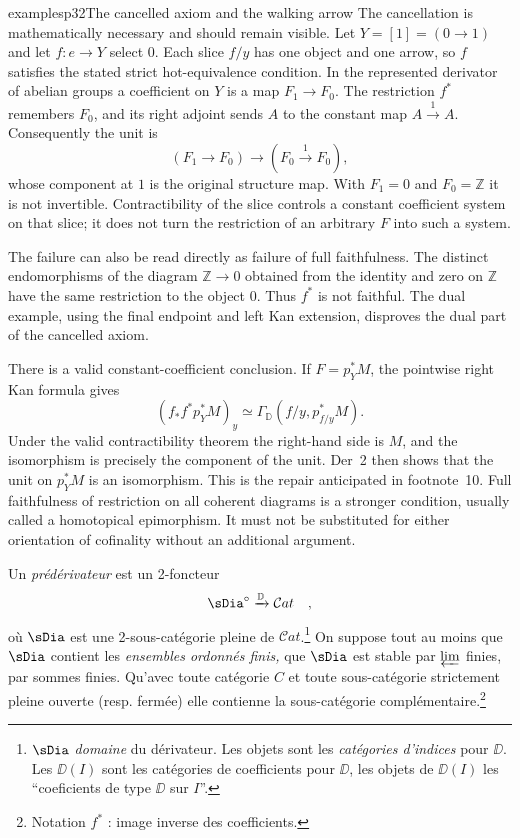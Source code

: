 \begin{dcomment}{examples}{p32}{The cancelled axiom and the walking arrow}
The cancellation is mathematically necessary and should remain visible.
Let $Y=[1]=(0\to1)$ and let $f:e\to Y$ select $0$. Each slice $f/y$
has one object and one arrow, so $f$ satisfies the stated strict
hot-equivalence condition. In the represented derivator of abelian
groups a coefficient on $Y$ is a map $F_1\to F_0$. The restriction
$f^*$ remembers $F_0$, and its right adjoint sends $A$ to the constant
map $A\xrightarrow{1}A$. Consequently the unit is
\[
 (F_1\longrightarrow F_0)\longrightarrow
 (F_0\xrightarrow{1}F_0),
\]
whose component at $1$ is the original structure map. With
$F_1=0$ and $F_0=\mathbb Z$ it is not invertible. Contractibility of
the slice controls a constant coefficient system on that slice; it
does not turn the restriction of an arbitrary $F$ into such a system.

The failure can also be read directly as failure of full faithfulness.
The distinct endomorphisms of the diagram
$\mathbb Z\to0$ obtained from the identity and zero on $\mathbb Z$
have the same restriction to the object $0$. Thus $f^*$ is not faithful.
The dual example, using the final endpoint and left Kan extension,
disproves the dual part of the cancelled axiom.

There is a valid constant-coefficient conclusion. If
$F=p_Y^*M$, the pointwise right Kan formula gives
\[
 (f_*f^*p_Y^*M)_y
 \simeq\Gamma_{\mathbb D}(f/y,p_{f/y}^*M).
\]
Under the valid contractibility theorem the right-hand side is $M$, and
the isomorphism is precisely the component of the unit. Der~2 then
shows that the unit on $p_Y^*M$ is an isomorphism. This is the repair
anticipated in footnote~10. Full faithfulness of restriction on all
coherent diagrams is a stronger condition, usually called a
homotopical epimorphism. It must not be substituted for either
orientation of cofinality without an additional argument.
\end{dcomment}


Un \textit{prédérivateur} est un 2-foncteur
\[ \sDia^\circ \xrightarrow{\DD} \mathcal{C}at \quad , \]
où $\sDia$ est une 2-sous-catégorie pleine de $\mathcal{C}at$.\footnote[11]{$\sDia$ \textit{domaine} du dérivateur. Les objets sont les \textit{catégories d'indices} pour $\DD$. Les $\DD(I)$ sont les catégories de coefficients pour $\DD$, les objets de $\DD(I)$ les “coeficients de type $\DD$ sur $I$”. %
} On suppose tout au moins que $\sDia$ contient les \textit{ensembles ordonnés finis,} que $\sDia$ est stable par $\varprojlim$ finies, par sommes finies. Qu'avec toute catégorie $C$ et toute sous-catégorie strictement pleine ouverte (resp. fermée) elle contienne la sous-catégorie complémentaire.\footnote[12]{Notation $f^*$ : image inverse des coefficients.}

